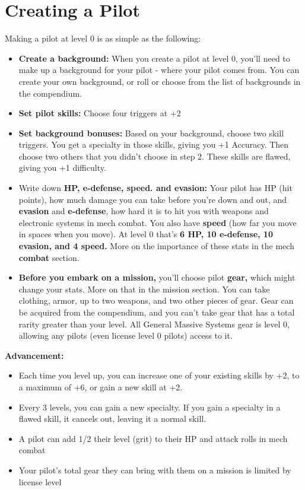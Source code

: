 \section{Creating a Pilot}

Making a pilot at level 0 is as simple as the following:

\begin{itemize}
\item \textbf{Create a background:} When you create a pilot at level 0, you’ll need to make up a background for your pilot - where your pilot comes from. You can create your own background, or roll or choose from the list of backgrounds in the compendium.
\item \textbf{Set pilot skills:} Choose four triggers at +2
\item \textbf{Set background bonuses:} Based on your background, choose two skill triggers. You get a specialty in those skills, giving you +1 Accuracy. Then choose two others that you didn’t choose in step 2. These skills are flawed, giving you +1 difficulty.
\item Write down \textbf{HP, e-defense, speed. and evasion:} Your pilot has HP (hit points), how much damage you can take before you’re down and out, and \textbf{evasion} and \textbf{e-defense}, how hard it is to hit you with weapons and electronic systems in mech combat. You also have \textbf{speed} (how far you move in spaces when you move). At level 0 that’s \textbf{6 HP, 10 e-defense, 10 evasion, and 4 speed.} More on the importance of these stats in the mech \textbf{combat} section.
\item \textbf{Before you embark on a mission,} you’ll choose pilot \textbf{gear,} which might change your stats. More on that in the mission section. You can take clothing, armor, up to two weapons, and two other pieces of gear. Gear can be acquired from the compendium, and you can’t take gear that has a total rarity greater than your level. All General Massive Systems gear is level 0, allowing any pilots (even license level 0 pilots) access to it.
\end{itemize}

\textbf{Advancement:}
\begin{itemize}
\item Each time you level up, you can increase one of your existing skills by +2, to a maximum of +6, or gain a new skill at +2.
\item Every 3 levels, you can gain a new specialty. If you gain a specialty in a flawed skill, it cancels out, leaving it a normal skill.
\item A pilot can add 1/2 their level (grit) to their HP and attack rolls in mech combat
\item Your pilot’s total gear they can bring with them on a mission is limited by license level
\end{itemize}

